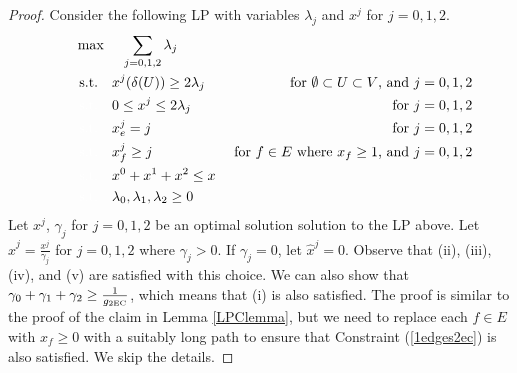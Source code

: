 \begin{proof}
	Consider the following LP with variables $\lambda_j$ and $x^j$ for $j=0,1,2$. 
	\begin{align}
		\quad\quad& \max\quad \;\sum_{j=0,1,2}\lambda_j\\
		&\;\text{s.t.} \quad x^j(\delta(U))\geq 2\lambda_j \;& \mbox{ for $\emptyset \subset U \subset V$, and $j=0,1,2$} \label{feasibility2ec}\\
		&\;{\color{white}{\text{s.t.}} }\quad 0 \leq x^j \leq 2\lambda_j\; &\mbox{ for $j=0,1,2$}\label{bound2ec}\\
		&\;{\color{white}{\text{s.t.}} }\quad x^j_e = j\; &\mbox{ for $j=0,1,2$}\label{branchcoordinate2ec}\\
		&\;{\color{white}{\text{s.t.}} }\quad x^j_f \geq j \; &\mbox{ for $f\in E$ where $x_f \geq 1$, and $j=0,1,2$}\label{1edges2ec}\\
		&\;{\color{white}{\text{s.t.}} }\quad x^0 + x^1+x^2 \leq x\label{packing2ec}\\
		&\;{\color{white}{\text{s.t.}} }\quad \lambda_0,\lambda_1,\lambda_2 \geq 0
	\end{align}	Let $x^j$, $\gamma_j$ for $j=0,1,2$ be an optimal solution solution to the LP above. Let $\hat{x}^{j}=\frac{x^j}{\gamma_j}$ for $j=0,1,2$ where $\gamma_j>0$. If $\gamma_j=0$, let $\hat{x}^{j}=0$. Observe that  (ii), (iii), (iv), and (v) are satisfied with this choice. We can also show that $\gamma_0+\gamma_1+\gamma_2\geq \frac{1}{g_{\operatorname{2EC}}}$, which means that (i) is also satisfied. The proof is similar to the proof of the claim in Lemma \ref{LPClemma}, but we need to replace each $f\in E$ with $x_f\geq 0$ with a suitably long path to ensure that Constraint (\ref{1edges2ec}) is also satisfied.	We skip the details.
\end{proof}

